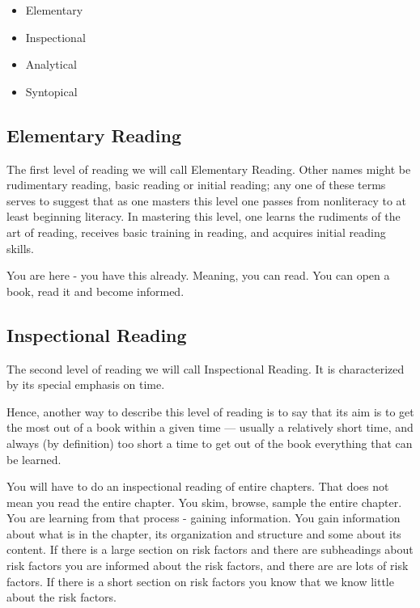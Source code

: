 \begin{itemize}
\item{Elementary}
\item{Inspectional}
\item{Analytical}
\item{Syntopical}
\end{itemize}
\vspace{.2in}

\subsection{Elementary Reading}

\begin{displayquote}
The first level of reading we will call Elementary Reading. Other names might be rudimentary reading, basic reading or initial reading; any one of these terms serves to suggest that as one masters this level one passes from nonliteracy to at least beginning literacy. In mastering this level, one learns the rudiments of the art of reading, receives basic training in reading, and acquires initial reading skills.
\end{displayquote}

You are here - you have this already. Meaning, you can read. You can open a book, read it and become informed.

\subsection{Inspectional Reading}
\begin{displayquote}
The second level of reading we will call Inspectional Reading. It is characterized by its special emphasis on time. 
\end{displayquote}

Hence, another way to describe this level of reading is to say that its aim is to get the most out of a book within a given time — usually a relatively short time, and always (by definition) too short a time to get out of the book everything that can be learned.

You will have to do an inspectional reading of entire chapters. That does not mean you read the entire chapter. You skim, browse, sample the entire chapter. You are learning from that process - gaining information. You gain information about what is in the chapter, its organization and structure and some about its content. If there is a large section on risk factors and there are subheadings about risk factors you are informed about the risk factors, and there are are lots of risk factors. If there is a short section on risk factors you know that we know little about the risk factors. 

